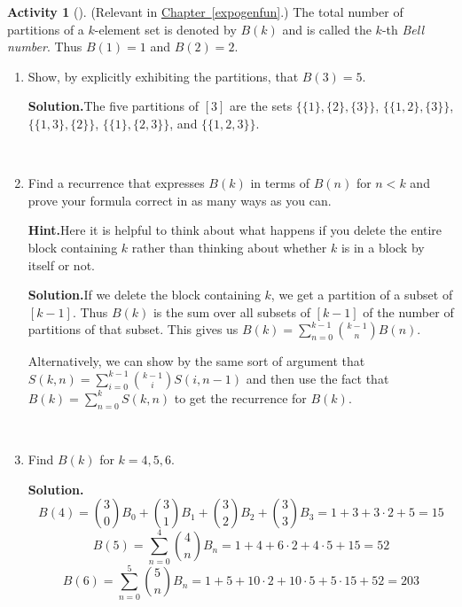 \documentclass[10pt,]{book}
\theoremstyle{plain}
\theoremstyle{definition}
\newtheorem{activity}[project]{Activity}
\numberwithin{equation}{chapter}
\newcommand{\lt}{<}
\begin{document}
\begin{activity}[]\label{BellNumberIntro}
(Relevant in \hyperref[expogenfun]{Chapter~\ref{expogenfun}}.) The total number of partitions of a \(k\)-element set is denoted by \(B(k)\) and is called the \(k\)-th \emph{Bell number}. Thus \(B(1)=1\) and \(B(2) =2\).%
~\par
\begin{enumerate}[label=(\alph*)]
 \item Show, by explicitly exhibiting the partitions, that \(B(3)=5\).%
\par\medskip\noindent%
\textbf{Solution.}\quad The five partitions of \([3]\) are the sets \(\{\{1\},
\{2\},\{3\}\}\), \(\{\{1,2\},\{3\}\}\), \(\{\{1,3\},\{2\}\}\), \(\{\{1\},\{2,3\}\}\), and \(\{\{1,2,3\}\}\).%

~\par
\item Find a recurrence that expresses \(B(k)\) in terms of \(B(n)\) for \(n\lt  k\) and prove your formula correct in as many ways as you can.%
\par\medskip\noindent%
\textbf{Hint.}\quad Here it is helpful to think about what happens if you delete the entire block containing \(k\) rather than thinking about whether \(k\) is in a block by itself or not.%
\par\medskip\noindent%
\textbf{Solution.}\quad If we delete the block containing \(k\), we get a partition of a subset of \([k-1]\). Thus \(B(k)\) is the sum over all subsets of \([k-1]\) of the number of partitions of that subset. This gives us \(B(k)= \sum_{n=0}^{k-1}\binom{k-1}{n}B(n)\).%
\par
Alternatively, we can show by the same sort of argument that \(S(k,n)=\sum_{i=0}^{k-1} \binom{k-1}{i}S(i,n-1)\) and then use the fact that \(B(k)=\sum_{n=0}^k S(k,n)\) to get the recurrence for \(B(k)\).%

~\par
\item Find \(B(k)\) for \(k=4,5,6\).%
\par\medskip\noindent%
\textbf{Solution.}\quad %
\begin{equation*}
B(4) =\binom{3}{0}B_0 +\binom{3}{1}B_1 +\binom{3}{2}B_2 +
\binom{3}{3}B_3=1 +3+3\cdot2 +5=15
\end{equation*}
%
\begin{equation*}
B(5) = \sum_{n=0}^4 \binom{4}{n}B_n = 1 +4+6\cdot2 +4\cdot5 + 15=52
\end{equation*}
%
\begin{equation*}
B(6) = \sum_{n=0}^5 \binom{5}{n}B_n =1+5 +10\cdot2 +10\cdot 5
+5\cdot 15 +52=203
\end{equation*}

\end{enumerate}
\end{activity}
\typeout{************************************************}
\typeout{************************************************}
\end{document}
